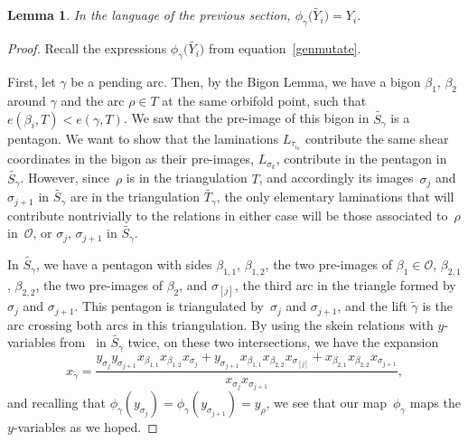 \documentclass[11pt]{article}
\numberwithin{equation}{section}
\newtheorem{Lemma}[Theorem]{Lemma}
\begin{document}
\begin{Lemma}\label{phimapsys}
In the language of the previous section, $\phi_\gamma\big(\widetilde{Y_i}\big) = Y_i$.
\end{Lemma}

\begin{proof}Recall the expressions $\phi_\gamma\big(\widetilde{Y_i}\big)$ from equation~\eqref{genmutate}.

First, let $\gamma$ be a pending arc. Then, by the Bigon Lemma, we have a bigon $\beta_1$, $\beta_2$ around $\gamma$ and the arc $\rho \in T$ at the same orbifold point, such that $e(\beta_i, T) < e(\gamma,T)$. We saw that the pre-image of this bigon in $\widetilde{S_\gamma}$ is a pentagon. We want to show that the laminations $L_{\tau_{i_k}}$ contribute the same shear coordinates in the bigon as their pre-images, $L_{\sigma_k}$, contribute in the pentagon in~$\widetilde{S_\gamma}$. However, since~$\rho$ is in the triangulation $T$, and accordingly its images~$\sigma_j$ and~$ \sigma_{j+1}$ in $\widetilde{S_\gamma}$ are in the triangulation $\widetilde{T_\gamma}$, the only elementary laminations that will contribute nontrivially to the relations in either case will be those associated to~$\rho$ in~$\mathcal{O}$, or $\sigma_j$, $\sigma_{j+1}$ in $\widetilde{S_\gamma}$.

In $\widetilde{S_\gamma}$, we have a pentagon with sides $\beta_{1,1}$, $\beta_{1,2}$, the two pre-images of $\beta_1 \in \mathcal{O}$, $\beta_{2,1}$, $\beta_{2,2}$, the two pre-images of $\beta_2$, and $\sigma_{[j]}$, the third arc in the triangle formed by~$\sigma_j$ and $\sigma_{j+1}$. This pentagon is triangulated by~$\sigma_j$ and $\sigma_{j+1}$, and the lift $\widetilde{\gamma}$ is the arc crossing both arcs in this triangulation. By using the skein relations with $y$-variables from~\cite{MW} in $\widetilde{S_\gamma}$ twice, on these two intersections, we have the expansion
\[ x_{\widetilde{\gamma}} = \frac{ y_{\sigma_j} y_{\sigma_{j+1}} x_{\beta_{1,1}}x_{\beta_{1,2}}x_{\sigma_j} + y_{\sigma_{j+1}} x_{\beta_{1,1}}x_{\beta_{2,2}}x_{\sigma_{[j]}} + x_{\beta_{2,1}}x_{\beta_{2,2}}x_{\sigma_{j+1}}}{x_{\sigma_j}x_{\sigma_{j+1}}},
\] and recalling that $\phi_\gamma(y_{\sigma_j}) = \phi_\gamma(y_{\sigma_{j+1}}) = y_\rho$, we see that our map~$\phi_\gamma$ maps the $y$-variables as we hoped.


\end{proof}
\end{document}
